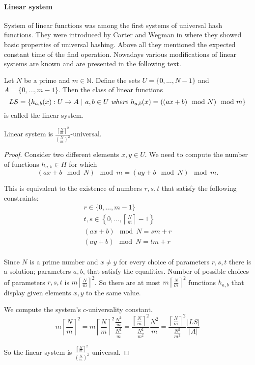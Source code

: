 \paragraph{Linear system}
System of linear functions was among the first systems of universal hash functions. They were introduced by Carter and Wegman in \cite{DBLP:journals/jcss/CarterW79} where they showed basic properties of universal hashing. Above all they mentioned the expected constant time of the find operation. Nowadays various modifications of linear systems are known and are presented in the following text. 

\begin{definition}
Let $N$ be a prime and $m \in \mathbb{N}$. Define the sets $U = \{0, \dots, N - 1 \}$ and $A = \{0, \dots, m - 1\}$. Then the class of linear functions 
\[ LS = \{h_{a, b}(x): U \rightarrow A \ | \  a, b \in U \textit{ where } h_{a, b}(x) = ((ax + b) \mod N) \mod m \} \]
is called the linear system.
\end{definition}

\begin{remark}
Linear system is $\frac{\left\lceil \frac{N}{m} \right\rceil ^ 2}{\left(\frac{N}{m}\right) ^ 2}$-universal.
\end{remark}
\begin{proof}
Consider two different elements $x, y \in U$. We need to compute the number of functions $h_{a, b} \in H$ for which 
\[ (ax + b \mod N) \mod m = (ay + b \mod N) \mod m \textit{.} \]

This is equivalent to the existence of numbers $r, s, t$ that satisfy the following constraints:
\begin{gather*}
r \in \{0, \dots, m - 1 \} \\
t, s \in \left\{ 0, \dots, \left \lceil \frac{N}{m} \right \rceil - 1 \right\} \\
(ax + b) \mod N = s m + r \\
(ay + b) \mod N = t m + r \\
\end{gather*}

Since $N$ is a prime number and $x \neq y$ for every choice of parameters $r, s, t$ there is a solution; parameters $a, b$, that satisfy the equalities.
Number of possible choices of parameters $r, s, t$ is $m \left \lceil \frac{N}{m} \right \rceil ^ 2$. So there are at most $m \left \lceil \frac{N}{m} \right \rceil ^ 2$ functions $h_{a, b}$ that display given elements $x, y$ to the same value.

We compute the system's $c$-universality constant.
\[
m \left \lceil \frac{N}{m} \right \rceil ^ 2 = 
m \left \lceil \frac{N}{m} \right \rceil ^ 2 \frac{\frac{N ^ 2}{m}}{\frac{N ^ 2}{m}} = 
\frac{\left \lceil \frac{N}{m} \right \rceil ^ 2}{\frac{N ^ 2}{m ^ 2}} \frac{N ^ 2}{m} = 
\frac{\left \lceil \frac{N}{m} \right \rceil ^ 2}{\frac{N ^ 2}{m ^ 2}} \frac{|LS|}{|A|}
\]

So the linear system is $\frac{\left \lceil \frac{N}{m} \right \rceil ^ 2}{\left(\frac{N}{m}\right) ^ 2}$-universal.
\end{proof}

